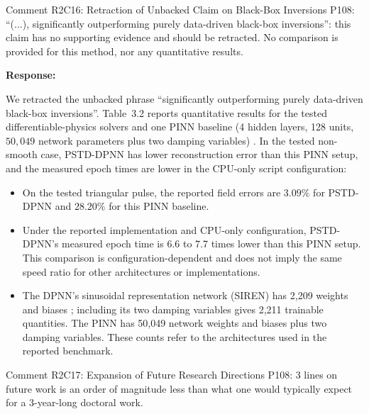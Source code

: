 \documentclass[11pt,a4paper]{article}
\newenvironment{response}{
    \par\vspace{1mm}\noindent\textbf{\textcolor{responseframe}{Response:}}\par\vspace{1mm}
}{
    \par\vspace{3mm}
}
\begin{document}
\begin{revcomment}{Comment R2C16: Retraction of Unbacked Claim on Black-Box Inversions}
P108: ``(...), significantly outperforming purely data-driven black-box inversions'': this claim has no supporting evidence and should be retracted. No comparison is provided for this method, nor any quantitative results.
\end{revcomment}

\begin{response}
We retracted the unbacked phrase ``significantly outperforming purely data-driven black-box inversions''. Table~3.2 reports quantitative results for the tested differentiable-physics solvers and one PINN baseline (4 hidden layers, 128 units, $50{,}049$ network parameters plus two damping variables) \citep{raissi_pinn_2019,haghighat_sciann_2021}. In the tested non-smooth case, PSTD-DPNN has lower reconstruction error than this PINN setup, and the measured epoch times are lower in the CPU-only script configuration:
\begin{itemize}
    \item On the tested triangular pulse, the reported field errors are $3.09\%$ for PSTD-DPNN and $28.20\%$ for this PINN baseline.
    \item Under the reported implementation and CPU-only configuration, PSTD-DPNN's measured epoch time is 6.6 to 7.7 times lower than this PINN setup. This comparison is configuration-dependent and does not imply the same speed ratio for other architectures or implementations.
    \item The DPNN's sinusoidal representation network (SIREN) has 2,209 weights and biases \citep{sitzmann_implicit_2020}; including its two damping variables gives 2,211 trainable quantities. The PINN has 50,049 network weights and biases plus two damping variables. These counts refer to the architectures used in the reported benchmark.
\end{itemize}
\end{response}

\begin{revcomment}{Comment R2C17: Expansion of Future Research Directions}
P108: 3 lines on future work is an order of magnitude less than what one would typically expect for a 3-year-long doctoral work.
\end{revcomment}
\end{document}

